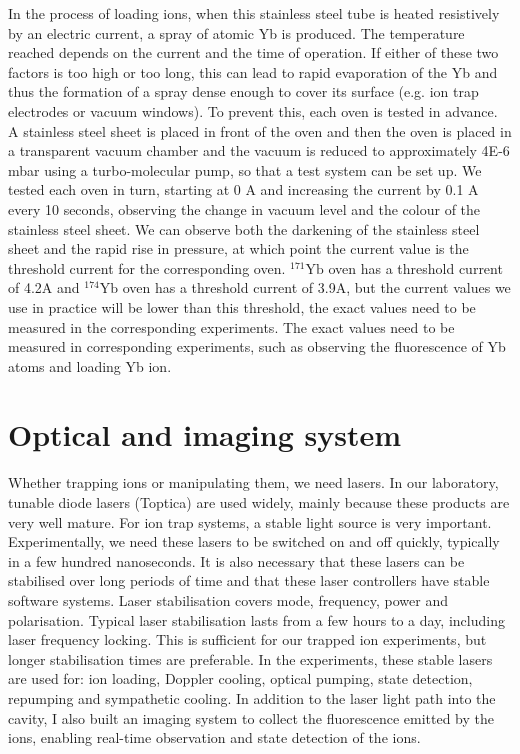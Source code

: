 In the process of loading ions, when this stainless steel tube is heated resistively by an electric current, a spray of atomic Yb is produced. The temperature reached depends on the current and the time of operation. If either of these two factors is too high or too long, this can lead to rapid evaporation of the Yb and thus the formation of a spray dense enough to cover its surface (e.g. ion trap electrodes or vacuum windows). To prevent this, each oven is tested in advance. A stainless steel sheet is placed in front of the oven and then the oven is placed in a transparent vacuum chamber and the vacuum is reduced to approximately 4E-6 mbar using a turbo-molecular pump, so that a test system can be set up. We tested each oven in turn, starting at 0 A and increasing the current by 0.1 A every 10 seconds, observing the change in vacuum level and the colour of the stainless steel sheet. We can observe both the darkening of the stainless steel sheet and the rapid rise in pressure, at which point the current value is the threshold current for the corresponding oven. ${ }^{171} \mathrm{Yb}$ oven has a threshold current of 4.2A and ${ }^{174} \mathrm{Yb}$ oven has a threshold current of 3.9A, but the current values we use in practice will be lower than this threshold, the exact values need to be measured in the corresponding experiments. The exact values need to be measured in corresponding experiments, such as observing the fluorescence of Yb atoms and loading Yb ion.



\section{Optical and imaging system}

Whether trapping ions or manipulating them, we need lasers. In our laboratory, tunable diode lasers (Toptica) are used widely, mainly because these products are very well mature. For ion trap systems, a stable light source is very important. Experimentally, we need these lasers to be switched on and off quickly, typically in a few hundred nanoseconds. It is also necessary that these lasers can be stabilised over long periods of time and that these laser controllers have stable software systems. Laser stabilisation covers mode, frequency, power and polarisation. Typical laser stabilisation lasts from a few hours to a day, including laser frequency locking. This is sufficient for our trapped ion experiments, but longer stabilisation times are preferable. In the experiments, these stable lasers are used for: ion loading, Doppler cooling, optical pumping, state detection, repumping and sympathetic cooling. In addition to the laser light path into the cavity, I also built an imaging system to collect the fluorescence emitted by the ions, enabling real-time observation and state detection of the ions.

